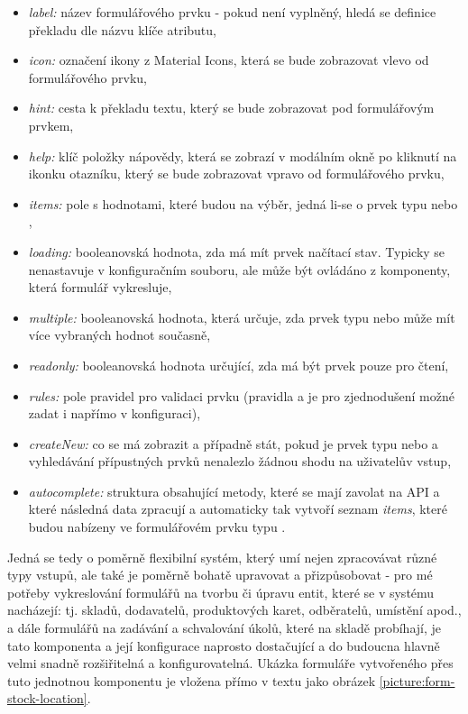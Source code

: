 \begin{itemize}
    \item \emph{label:} název formulářového prvku - pokud není vyplněný, hledá se definice překladu dle názvu klíče atributu,
    \item \emph{icon:} označení ikony z Material Icons, která se bude zobrazovat vlevo od formulářového prvku,
    \item \emph{hint:} cesta k překladu textu, který se bude zobrazovat pod formulářovým prvkem,
    \item \emph{help:} klíč položky nápovědy, která se zobrazí v modálním okně po kliknutí na ikonku otazníku, který se bude zobrazovat vpravo od formulářového prvku,
    \item \emph{items:} pole s hodnotami, které budou na výběr, jedná li-se o prvek typu  nebo ,
    \item \emph{loading:} booleanovská hodnota, zda má mít prvek načítací stav. Typicky se nenastavuje v konfiguračním souboru, ale může být ovládáno z komponenty, která formulář vykresluje,
    \item \emph{multiple:} booleanovská hodnota, která určuje, zda prvek typu  nebo  může mít více vybraných hodnot současně,
    \item \emph{readonly:} booleanovská hodnota určující, zda má být prvek pouze pro čtení,
    \item \emph{rules:} pole pravidel pro validaci prvku (pravidla  a  je pro zjednodušení možné zadat i napřímo v konfiguraci),
    \item \emph{createNew:} co se má zobrazit a případně stát, pokud je prvek typu  nebo  a vyhledávání přípustných prvků nenalezlo žádnou shodu na uživatelův vstup,
    \item \emph{autocomplete:} struktura obsahující metody, které se mají zavolat na API a které následná data zpracují a automaticky tak vytvoří seznam \emph{items}, které budou nabízeny ve formulářovém prvku typu .
\end{itemize}

Jedná se tedy o poměrně flexibilní systém, který umí nejen zpracovávat různé typy vstupů, ale také je poměrně bohatě upravovat a přizpůsobovat - pro mé potřeby vykreslování formulářů na tvorbu či úpravu entit, které se v systému nacházejí: tj. skladů, dodavatelů, produktových karet, odběratelů, umístění apod., a dále formulářů na zadávání a schvalování úkolů, které na skladě probíhají, je tato komponenta a její konfigurace naprosto dostačující a do budoucna hlavně velmi snadně rozšiřitelná a konfigurovatelná. Ukázka formuláře vytvořeného přes tuto jednotnou komponentu je vložena přímo v textu jako obrázek \ref{picture:form-stock-location}.

